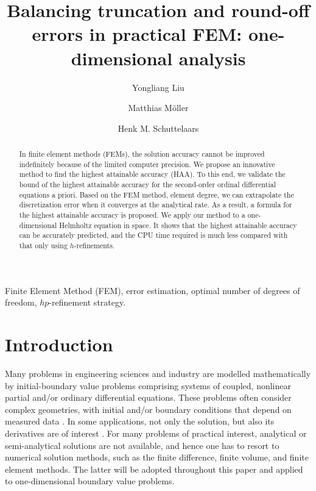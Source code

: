 \documentclass[review,3p]{elsarticle}
\begin{document}

\begin{frontmatter}

\title{Balancing truncation and round-off errors in practical FEM: one-dimensional analysis}

 \author[1]{Yongliang Liu}
 \author[1]{Matthias M\"oller}
 \author[1]{Henk M. Schuttelaars}
 
 \address[1]{Delft Institute of Applied Mathematics\\ Delft University of Technology\\ Van Mourik Broekmanweg 6, 2628 XE Delft, The Netherlands}

\begin{abstract}
In finite element methods (FEMs), the solution accuracy cannot be improved indefinitely because of the limited computer precision. We propose an innovative method to find the highest attainable accuracy (HAA). To this end, we validate the bound of the highest attainable accuracy for the second-order ordinal differential equations a priori. Based on the FEM method, element degree, we can extrapolate the discretization error when it converges at the analytical rate. As a result, a formula for the highest attainable accuracy is proposed. We apply our method to a one-dimensional Helmholtz equation in space. It shows that the highest attainable accuracy can be accurately predicted, and the CPU time required is much less compared with that only using $h$-refinements. 
\end{abstract}

\begin{keyword}
Finite Element Method (FEM), error estimation, optimal number of degrees of freedom, $hp$-refinement strategy.
\end{keyword}

\end{frontmatter}

\section{Introduction}

Many problems in engineering sciences and industry are modelled mathematically by initial-boundary value problems comprising systems of coupled, nonlinear partial and/or ordinary differential equations. These problems often consider complex geometries, with initial and/or boundary conditions that depend on measured data \cite{Kumar2016}. 
In some applications, not only the solution, but also its derivatives are of interest \cite{Kumar2016,carey1982derivative}.
For many problems of practical interest, analytical or semi-analytical solutions are not available, and hence one has to resort to numerical solution methods, such as the finite difference, finite volume, and finite element methods. The latter will be adopted throughout this paper and applied to one-dimensional boundary value problems.
\end{document}
